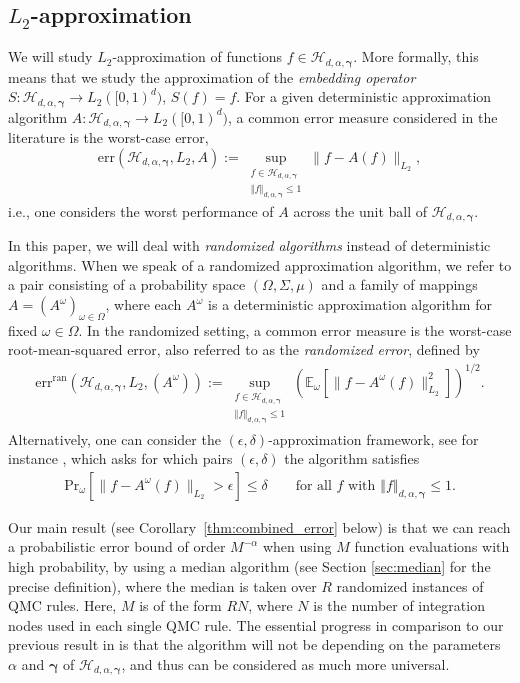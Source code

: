 \documentclass[a4paper,11pt]{article}
\newcommand{\bsgamma}{\boldsymbol{\gamma}}
\newcommand{\EE}{\mathbb{E}}
\newcommand{\Hcal}{\mathcal{H}}
\newcommand{\norm}[1]{\left\Vert#1\right\Vert}
\begin{document}
\subsection{$L_2$-approximation}
We will study $L_2$-approximation of functions $f\in \Hcal_{d,\alpha,\bsgamma}$. More formally, this means that we study the approximation of the \textit{embedding
operator} $S:\Hcal_{d,\alpha,\bsgamma}\to L_2 ([0,1)^d)$, $S(f)=f$. For a given deterministic approximation algorithm $A:\Hcal_{d,\alpha,\bsgamma}\to L_2 ([0,1)^d)$, a common error measure considered in the literature is the worst-case error,
\[
  \mathrm{err}(\Hcal_{d,\alpha,\bsgamma}, L_2, A):= \sup_{\substack{f\in \Hcal_{d,\alpha,\bsgamma}\\ 
  \norm{f}_{d,\alpha,\bsgamma}\le 1}}
  \|f-A(f)\|_{L_2},
\]
i.e., one considers the worst performance of $A$ across the unit ball of $\Hcal_{d,\alpha,\bsgamma}$. 

In this paper, we will deal with \textit{randomized algorithms} instead of deterministic algorithms. When we speak of a randomized approximation algorithm, we refer to a pair consisting of a probability space $(\Omega, \Sigma, \mu)$ and a family of mappings $A = (A^\omega)_{\omega \in \Omega}$, where each $A^\omega$ is a deterministic approximation algorithm for fixed $\omega \in \Omega$. 
In the randomized setting, a common error measure is the worst-case root-mean-squared error, also referred to as the \emph{randomized error}, defined by
\begin{align*}
  \mathrm{err}^{\mathrm{ran}}(\Hcal_{d,\alpha,\bsgamma}, L_2, (A^{\omega})):= \sup_{\substack{f\in \Hcal_{d,\alpha,\bsgamma}\\ 
  \norm{f}_{d,\alpha,\bsgamma}\le 1}}
  \left(\EE_{\omega}\left[\|f-A^{\omega}(f)\|^2_{L_2}\right]\right)^{1/2}.
\end{align*}
Alternatively, one can consider the $(\epsilon,\delta)$-approximation framework, see for instance \cite{kunsch2019optimal}, which asks for which pairs $(\epsilon,\delta)$ the algorithm satisfies
\begin{align}\label{eq:eps-delta_framework} 
\mathrm{Pr}_{\omega}\left[\|f-A^{\omega}(f)\|_{L_2}>\epsilon \right]\le \delta \qquad \text{for all $f$ with $\norm{f}_{d,\alpha,\bsgamma}\le 1$.} 
\end{align}

Our main result (see Corollary~\ref{thm:combined_error} below) is that we can reach a probabilistic error bound of order $M^{-\alpha}$ when using $M$ function evaluations with high probability, by using a median algorithm (see Section \ref{sec:median} for the precise definition), where the median is taken over $R$ randomized instances of QMC rules. Here, $M$ is of the form $RN$, where $N$ is the number of integration nodes used in each single QMC rule. The essential progress in comparison to our previous result in \cite{PKG24} is that the algorithm will not be depending on the parameters $\alpha$ and $\bsgamma$ of $\Hcal_{d,\alpha,\bsgamma}$, and thus can be considered as much more universal. 
\end{document}
